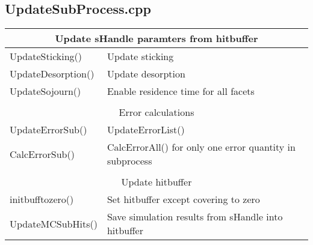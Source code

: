 \subsection{UpdateSubProcess.cpp}

\begin{center}
\begin{tabular}{|l|l|}
\hline
\multicolumn{2}{|c|}{\rule{0pt}{3ex}Update sHandle paramters from hitbuffer}\\
\hline
\rule{0pt}{3ex} UpdateSticking()& Update sticking\\
\rule{0pt}{3ex} UpdateDesorption()& Update desorption \\
\rule{0pt}{3ex} UpdateSojourn()& Enable residence time for all facets\\%
\hline
\multicolumn{2}{l}{}\\
\hline
\multicolumn{2}{|c|}{\rule{0pt}{3ex}Error calculations}\\
\hline
\rule{0pt}{3ex} UpdateErrorSub()& UpdateErrorList()\\
\rule{0pt}{3ex} CalcErrorSub()&  CalcErrorAll() for only one error quantity in subprocess\\
\hline
\multicolumn{2}{l}{}\\
\hline
\multicolumn{2}{|c|}{\rule{0pt}{3ex}Update hitbuffer}\\
\hline
\rule{0pt}{3ex} initbufftozero()& Set hitbuffer except covering to zero\\
\rule{0pt}{3ex} UpdateMCSubHits()& Save simulation results from sHandle into hitbuffer\\
\hline
\end{tabular}
\end{center}


